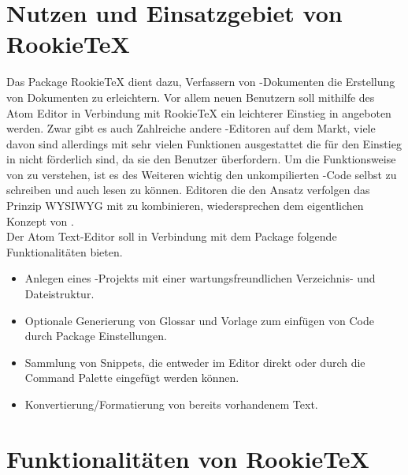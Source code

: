     \section{Nutzen und Einsatzgebiet von RookieTeX}
    Das Package RookieTeX dient dazu, Verfassern von \tex-Dokumenten die Erstellung von Dokumenten zu erleichtern. Vor allem neuen \latex Benutzern soll mithilfe des Atom Editor in Verbindung mit RookieTeX ein leichterer Einstieg in \latex angeboten werden. Zwar gibt es auch Zahlreiche andere \latex-Editoren auf dem Markt, viele davon sind allerdings mit sehr vielen Funktionen ausgestattet die für den Einstieg in \tex nicht förderlich sind, da sie den Benutzer überfordern. Um die Funktionsweise von \latex zu verstehen, ist es des Weiteren wichtig den unkompilierten \latex-Code selbst zu schreiben und auch lesen zu können. Editoren die den Ansatz verfolgen das Prinzip WYSIWYG mit \latex zu kombinieren, wiedersprechen dem eigentlichen Konzept von \latex.
    \\
    Der Atom Text-Editor soll in Verbindung mit dem Package folgende Funktionalitäten bieten.
    \\[5mm]
    \begin{itemize}
        \item Anlegen eines \tex-Projekts mit einer wartungsfreundlichen Verzeichnis- und Dateistruktur.
        \item Optionale Generierung von Glossar und Vorlage zum einfügen von Code durch Package Einstellungen.
        \item Sammlung von Snippets, die entweder im Editor direkt oder durch die Command Palette eingefügt werden können.
        \item Konvertierung/Formatierung von bereits vorhandenem Text.
    \end{itemize}

    \section{Funktionalitäten von RookieTeX}
